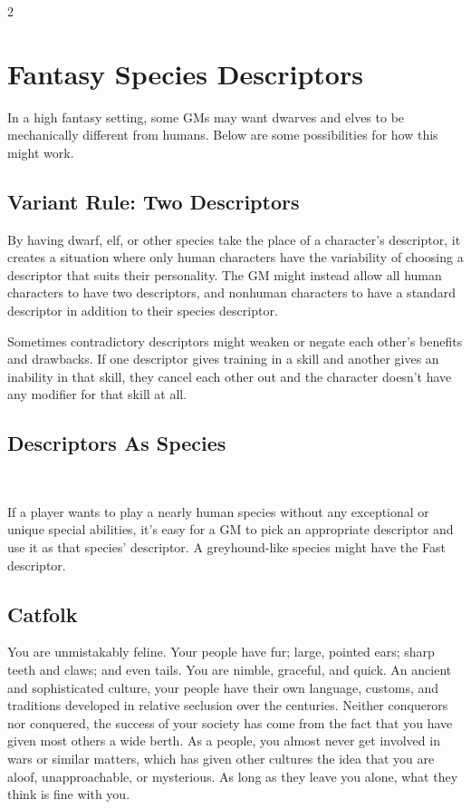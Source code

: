 \begin{multicols}{2}

\chapter{Fantasy Species Descriptors}

In a high fantasy setting, some GMs may want dwarves and elves to be mechanically different from humans. Below are some possibilities for how this might work.

\section{Variant Rule: Two Descriptors}

By having dwarf, elf, or other species take the place of a character’s descriptor, it creates a situation where only human characters have the variability of choosing a descriptor that suits their personality. The GM might instead allow all human characters to have two descriptors, and nonhuman characters to have a standard descriptor in addition to their species descriptor.

Sometimes contradictory descriptors might weaken or negate each other’s benefits and drawbacks. If one descriptor gives training in a skill and another gives an inability in that skill, they cancel each other out and the character doesn’t have any modifier for that skill at all.

\section{Descriptors As Species} 

If a player wants to play a nearly human species without any exceptional or unique special abilities, it’s easy for a GM to pick an appropriate descriptor and use it as that species’ descriptor. A greyhound-like species might have the Fast descriptor.

\section{Catfolk}

You are unmistakably feline. Your people have fur; large, pointed ears; sharp teeth and claws; and even tails. You are nimble, graceful, and quick. An ancient and sophisticated culture, your people have their own language, customs, and traditions developed in relative seclusion over the centuries. Neither conquerors nor conquered, the success of your society has come from the fact that you have given most others a wide berth. As a people, you almost never get involved in wars or similar matters, which has given other cultures the idea that you are aloof, unapproachable, or mysterious. As long as they leave you alone, what they think is fine with you. 


\end{multicols}
